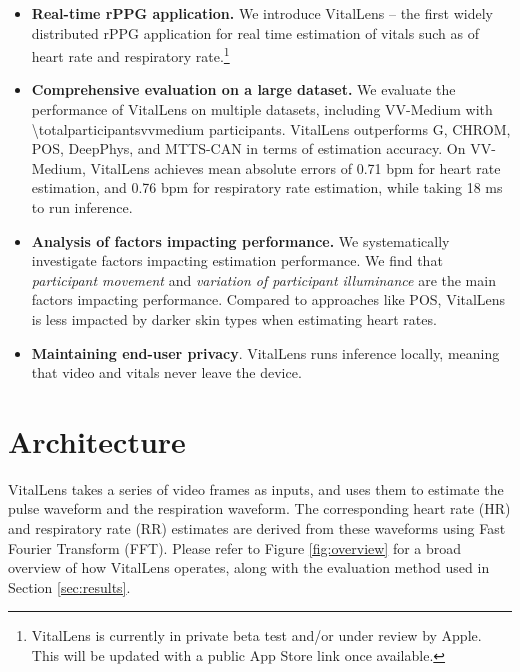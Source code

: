 \documentclass{article}
\begin{document}
\begin{itemize}
	\item \textbf{Real-time rPPG application.} We introduce VitalLens -- the first widely distributed rPPG application for real time estimation of vitals such as of heart rate and respiratory rate.\footnote{VitalLens is currently in private beta test and/or under review by Apple. This will be updated with a public App Store link once available.} 
	\item \textbf{Comprehensive evaluation on a large dataset.} We evaluate the performance of VitalLens on multiple datasets, including VV-Medium \cite{toye2023vital} with \num{\totalparticipantsvvmedium} participants. VitalLens outperforms G, CHROM, POS, DeepPhys, and MTTS-CAN in terms of estimation accuracy. On VV-Medium, VitalLens achieves mean absolute errors of 0.71 bpm for heart rate estimation, and 0.76 bpm for respiratory rate estimation, while taking 18 ms to run inference.
	\item \textbf{Analysis of factors impacting performance.} We systematically investigate factors impacting estimation performance. We find that \textit{participant movement} and \textit{variation of participant illuminance} are the main factors impacting performance. Compared to approaches like POS, VitalLens is less impacted by darker skin types when estimating heart rates. 
	\item \textbf{Maintaining end-user privacy}. VitalLens runs inference locally, meaning that video and vitals never leave the device.
\end{itemize}

\section{Architecture}
\label{sec:architecture}

VitalLens takes a series of video frames as inputs, and uses them to estimate the pulse waveform and the respiration waveform.
The corresponding heart rate (HR) and respiratory rate (RR) estimates are derived from these waveforms using Fast Fourier Transform (FFT).
Please refer to Figure \ref{fig:overview} for a broad overview of how VitalLens operates, along with the evaluation method used in Section \ref{sec:results}.
\end{document}
